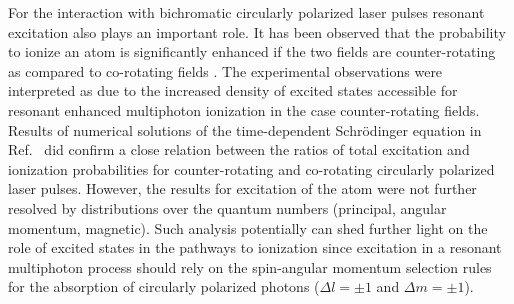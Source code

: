 For the interaction with bichromatic circularly polarized laser pulses resonant excitation also plays an important role. It has been observed that the probability to ionize an atom is significantly enhanced if the two fields are counter-rotating as compared to co-rotating fields \cite{mancuso2016}. The experimental observations were interpreted as due to the increased density of excited states accessible for resonant enhanced multiphoton ionization in the case counter-rotating fields. Results of numerical solutions of the time-dependent Schr\"odinger equation in Ref.\ \cite{mancuso2016} did confirm a close relation between the ratios of total excitation and ionization probabilities for counter-rotating and co-rotating circularly polarized laser pulses. However, the results for excitation of the atom were not further resolved by distributions over the quantum numbers (principal, angular momentum, magnetic). Such analysis potentially can shed further light on the role of excited states in the pathways to ionization since excitation in a resonant multiphoton process should rely on the spin-angular momentum selection rules for the absorption of circularly polarized photons ($\Delta l = \pm 1$ and $\Delta m = \pm 1$).


